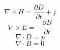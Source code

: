 \documentclass{article}
\begin{document}
\pagestyle{empty}
\[ \nabla \times H = \frac{\partial D}{\partial t} + j\]
\[ \nabla \times E = - \frac{\partial B}{\partial t}\]
\[ \nabla \cdot D = p\]
\[ \nabla \cdot B = 0\]
\end{document}
